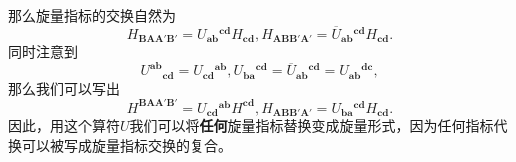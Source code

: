那么旋量指标的交换自然为
\begin{equation*}
	H_{\boldsymbol{BAA} '\boldsymbol{B} '} =U{_{\boldsymbol{ab}}}^{\boldsymbol{cd}} H_{\boldsymbol{cd}} ,H_{\boldsymbol{ABB} '\boldsymbol{A} '} =\overline{U}{_{\boldsymbol{ab}}}^{\boldsymbol{cd}} H_{\boldsymbol{cd}} .
\end{equation*}
同时注意到
\begin{equation*}
	U^{\boldsymbol{ab}}{}_{\boldsymbol{cd}} =U{_{\boldsymbol{cd}}}^{\boldsymbol{ab}} ,U{_{\boldsymbol{ba}}}^{\boldsymbol{cd}} =\overline{U}{_{\boldsymbol{ab}}}^{\boldsymbol{cd}} =U{_{\boldsymbol{ab}}}^{\boldsymbol{dc}} ,
\end{equation*}
那么我们可以写出
\begin{equation*}
	H^{\boldsymbol{BAA} '\boldsymbol{B} '} =U{_{\boldsymbol{cd}}}^{\boldsymbol{ab}} H^{\boldsymbol{cd}} ,H_{\boldsymbol{ABB} '\boldsymbol{A} '} =U{_{\boldsymbol{ba}}}^{\boldsymbol{cd}} H_{\boldsymbol{cd}} .
\end{equation*}
因此，用这个算符$U$我们可以将\textbf{任何}旋量指标替换变成旋量形式，因为任何指标代换可以被写成旋量指标交换的复合。



